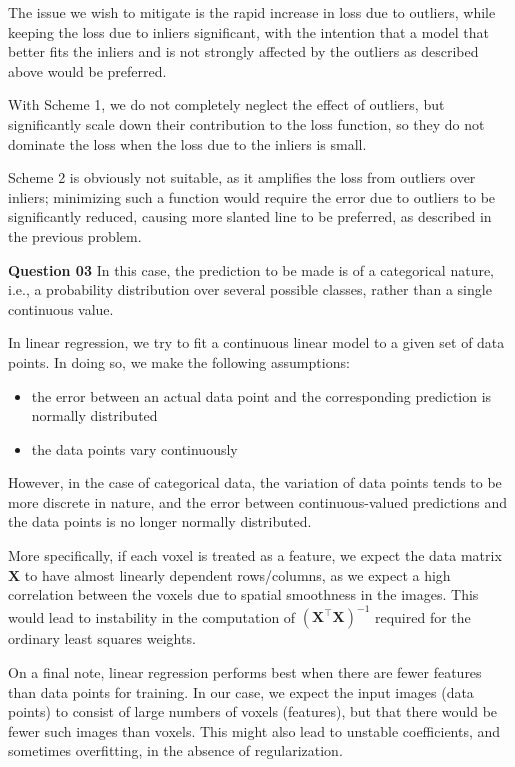 \documentclass{article}[a4paper]
\begin{document}
	The issue we wish to mitigate is the rapid increase in loss due to outliers, while keeping the loss due to inliers significant, with the intention that a model that better fits the inliers and is not strongly affected by the outliers as described above would be preferred.

	With Scheme 1, we do not completely neglect the effect of outliers, but significantly scale down their contribution to the loss function, so they do not dominate the loss when the loss due to the inliers is small.

	Scheme 2 is obviously not suitable, as it amplifies the loss from outliers over inliers; minimizing such a function would require the error due to outliers to be significantly reduced, causing more slanted line to be preferred, as described in the previous problem.
	\medskip
	
	\textbf{Question 03} In this case, the prediction to be made is of a categorical nature, i.e., a probability distribution over several possible classes, rather than a single continuous value.
	
	In linear regression, we try to fit a continuous linear model to a given set of data points. In doing so, we make the following assumptions:
	\begin{itemize}[noitemsep]
		\item the error between an actual data point and the corresponding prediction is normally distributed
		\item the data points vary continuously
	\end{itemize}
	However, in the case of categorical data, the variation of data points tends to be more discrete in nature, and the error between continuous-valued predictions and the data points is no longer normally distributed.

	More specifically, if each voxel is treated as a feature, we expect the data matrix $\mathbf{X}$ to have almost linearly dependent rows/columns, as we expect a high correlation between the voxels due to spatial smoothness in the images. This would lead to instability in the computation of $\left(\mathbf{X}^\top\mathbf{X}\right)^{-1}$ required for the ordinary least squares weights.

	On a final note, linear regression performs best when there are fewer features than data points for training. In our case, we expect the input images (data points) to consist of large numbers of voxels (features), but that there would be fewer such images than voxels. This might also lead to unstable coefficients, and sometimes overfitting, in the absence of regularization.
\end{document}
